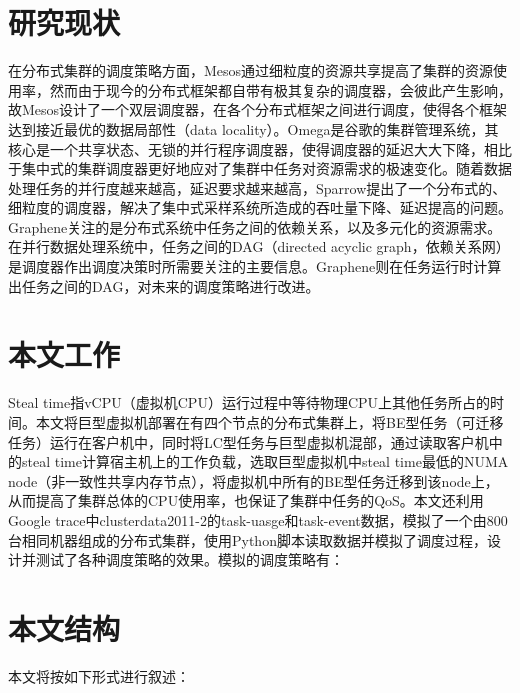 \section{研究现状}
\label{chap:dissch}
在分布式集群的调度策略方面，Mesos\cite{mesos}通过细粒度的资源共享提高了集群的资源使用率，然而由于现今的分布式框架都自带有极其复杂的调度器，会彼此产生影响，故Mesos设计了一个双层调度器，在各个分布式框架之间进行调度，使得各个框架达到接近最优的数据局部性（data locality）。Omega\cite{omega}是谷歌的集群管理系统，其核心是一个共享状态、无锁的并行程序调度器，使得调度器的延迟大大下降，相比于集中式的集群调度器更好地应对了集群中任务对资源需求的极速变化。随着数据处理任务的并行度越来越高，延迟要求越来越高，Sparrow\cite{sparrow}提出了一个分布式的、细粒度的调度器，解决了集中式采样系统所造成的吞吐量下降、延迟提高的问题。Graphene\cite{graphene}关注的是分布式系统中任务之间的依赖关系，以及多元化的资源需求。在并行数据处理系统中，任务之间的DAG（directed acyclic graph，依赖关系网）是调度器作出调度决策时所需要关注的主要信息。Graphene则在任务运行时计算出任务之间的DAG，对未来的调度策略进行改进。

\section{本文工作}
Steal time指vCPU（虚拟机CPU）运行过程中等待物理CPU上其他任务所占的时间。本文将巨型虚拟机部署在有四个节点的分布式集群上，将BE型任务（可迁移任务）运行在客户机中，同时将LC型任务与巨型虚拟机混部，通过读取客户机中的steal time计算宿主机上的工作负载，选取巨型虚拟机中steal time最低的NUMA node（非一致性共享内存节点），将虚拟机中所有的BE型任务迁移到该node上，从而提高了集群总体的CPU使用率，也保证了集群中任务的QoS。本文还利用Google trace中clusterdata2011-2的task-uasge和task-event数据，模拟了一个由800台相同机器组成的分布式集群，使用Python脚本读取数据并模拟了调度过程，设计并测试了各种调度策略的效果。模拟的调度策略有：


\section{本文结构}
本文将按如下形式进行叙述：
